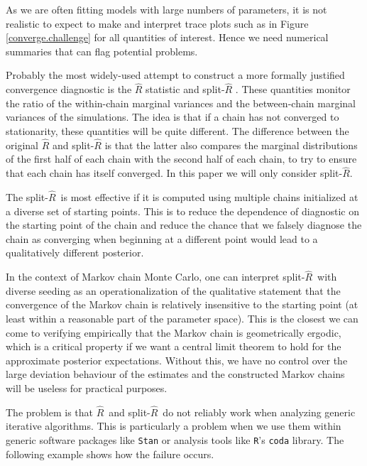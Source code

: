 \documentclass[american,]{article}
\newcommand{\Rhat}{$\widehat{R}$}
\newcommand{\sRhat}{split-$\widehat{R}$}
\begin{document}
As we are often fitting models with large
numbers of parameters, it is not realistic to expect to make and interpret
trace plots such as in Figure \ref{converge.challenge} for all
quantities of interest. Hence we need numerical summaries that can flag
potential problems. 


Probably the most widely-used attempt to construct a more formally justified 
convergence diagnostic  is the  \(\widehat{R}\) statistic
\citep{Gelman+Rubin:1992, Brooks+Gelman:1998} and
split-\(\widehat{R}\) \citep{BDA3}.  These quantities monitor the ratio of
the within-chain marginal variances and the between-chain marginal variances
of the simulations. The idea is that if a chain has not converged to 
stationarity, these quantities will be quite different.  The difference between
the original $\widehat{R}$ and split-$\widehat{R}$ is that the latter also compares 
the marginal distributions of the first half of each chain with the second
half of each chain, to try to ensure that each chain has itself converged.  In this
paper we will only consider \sRhat .

The \sRhat\ is most effective if it is computed using multiple chains initialized at a 
diverse set of starting points. This is to reduce the dependence of diagnostic
on the starting point of the chain and reduce the chance that we falsely diagnose
the chain as converging when beginning at a different point would lead to a 
qualitatively different posterior.

In the context of Markov chain Monte Carlo, one can interpret \sRhat\ 
with diverse seeding as an operationalization of the qualitative statement 
that the convergence of the Markov chain is relatively insensitive to the starting point (at least within a 
reasonable part of the parameter space). This is the closest we can come to 
verifying empirically that the Markov chain is geometrically ergodic, which is a critical 
property if we want  a central limit theorem to hold for the approximate
posterior expectations. Without this, we have no control over the large
deviation behaviour of the estimates and the constructed Markov chains will
be useless for practical purposes.

 
The problem is that \Rhat\ and \sRhat\ do not reliably work when analyzing generic iterative algorithms.  This is particularly a problem when we use them within generic software packages like \texttt{Stan} or analysis tools like \texttt{R}'s \texttt{coda} library.  The following example shows how the failure occurs.
\end{document}
